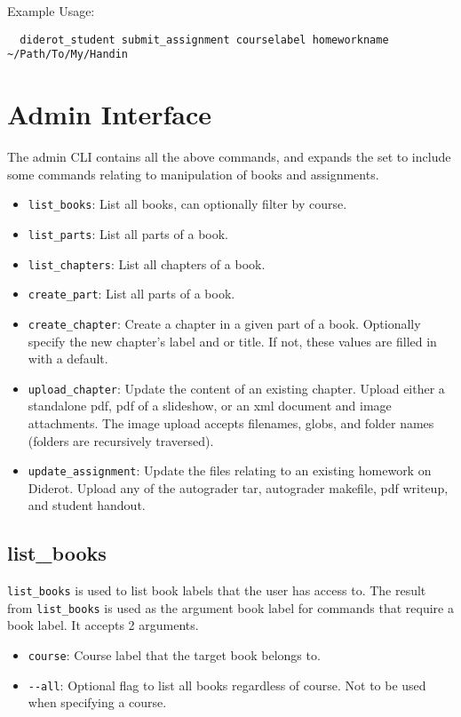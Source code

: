 Example Usage:
\begin{verbatim}
  diderot_student submit_assignment courselabel homeworkname ~/Path/To/My/Handin
\end{verbatim}

\section{Admin Interface}

The admin CLI contains all the above commands, and expands the set to include
some commands relating to manipulation of books and assignments.

\begin{itemize}
  \item \verb|list_books|: List all books, can optionally filter by course.
  \item \verb|list_parts|: List all parts of a book.
  \item \verb|list_chapters|: List all chapters of a book.
  \item \verb|create_part|: List all parts of a book.
  \item \verb|create_chapter|: Create a chapter in a given part of a
    book. Optionally specify the new chapter's label and or title. If
    not, these values are filled in with a default.

  \item \verb|upload_chapter|: Update the content of an existing
    chapter. Upload either a standalone pdf, pdf of a slideshow, or an
    xml document and image attachments.  The image upload accepts
    filenames, globs, and folder names (folders are recursively
    traversed).
  \item \verb|update_assignment|: Update the files relating to an existing homework on Diderot.  Upload any of the autograder tar, autograder makefile, pdf writeup, and student handout.
\end{itemize}

\subsection{list\_books}

\verb|list_books| is used to list book labels that the user has access to.
%
The result from \verb|list_books| is used as the argument book label for commands
that require a book label.
%
It accepts 2 arguments.

\begin{itemize}
  \item \verb|course|: Course label that the target book belongs to.
  \item \verb|--all|: Optional flag to list all books regardless of course. Not to be used when specifying a course.
\end{itemize}

